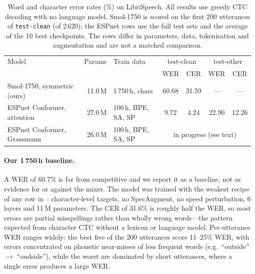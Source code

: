 \documentclass[11pt,a4paper]{article}
\begin{document}
\begin{table}[h]
\centering
\caption{Word and character error rates (\%) on LibriSpeech.  All
results use greedy CTC decoding with no language model.  Smol-1750 is
scored on the first 200 utterances of \texttt{test-clean} (of 2\,620);
the ESPnet rows use the full test sets and the average of the 10 best
checkpoints.  The rows differ in parameters, data, tokenisation and
augmentation and are not a matched comparison.}
\label{tab:wer}
\begin{tabular}{lrlcccc}
\toprule
Model & Params & Train data & \multicolumn{2}{c}{test-clean} &
  \multicolumn{2}{c}{test-other} \\
 & & & WER & CER & WER & CER \\
\midrule
Smol-1750, symmetric (ours) & 11.0\,M & 1\,750\,h, chars
  & 60.68 & 31.59 & --- & --- \\
\midrule
ESPnet Conformer, attention & 27.0\,M & 100\,h, BPE, SA, SP
  & 9.72 & 4.24 & 22.90 & 12.26 \\
ESPnet Conformer, Grassmann & 26.0\,M & 100\,h, BPE, SA, SP
  & \multicolumn{4}{c}{in progress (see text)} \\
\bottomrule
\end{tabular}
\end{table}

\paragraph{Our 1\,750\,h baseline.}
A WER of 60.7\% is far from competitive and we report it as a baseline,
not as evidence for or against the mixer.  The model was trained with
the weakest recipe of any row in~: character-level
targets, no SpecAugment, no speed perturbation, 6 layers and 11\,M
parameters.  The CER of 31.6\% is roughly half the WER, so most errors
are partial misspellings rather than wholly wrong words---the pattern
expected from character CTC without a lexicon or language model.
Per-utterance WER ranges widely: the best five of the 200 utterances
score 11--25\% WER, with errors concentrated on phonetic near-misses of
less frequent words (e.g.\ ``outside'' $\to$ ``oudside''), while the
worst are dominated by short utterances, where a single error produces
a large WER.
\end{document}
